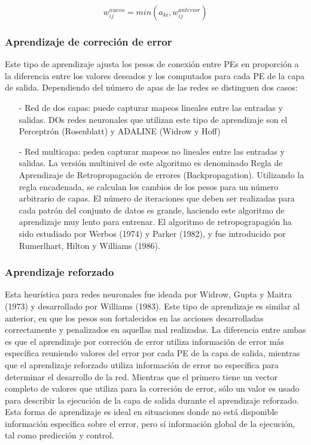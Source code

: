 $$ w_{ij}^{nuevo} = min(a_{ki},w_{ij}^{anterior}) $$

\subsubsection{Aprendizaje de correción de error}

Este tipo de aprendizaje ajusta los pesos de conexión entre PEs en proporción a
la diferencia entre los valores deseados y los computados para cada PE de la
capa de salida. Dependiendo del número de apas de las redes se distinguen dos
casos:
\begin{itemize}
	\item[-] Red de dos capas: puede capturar mapeos lineales entre las entradas 
	y salidas. DOs redes neuronales que utilizan este tipo de aprendizaje son el 
	Perceptrón (Rosenblatt) y ADALINE (Widrow y Hoff)
	\item[-] Red multicapa: peden capturar mapeos no lineales entre las entradas 
	y salidas. La versión multinivel de este algoritmo es denominado Regla de 
	Aprendizaje de Retropropagación de errores (Backpropagation). Utilizando la 
	regla encadenada, se calculan los cambios de los pesos para un número arbitrario 
	de capas. El número de iteraciones que deben ser realizadas para cada patrón 
	del conjunto de datos es grande, haciendo este algoritmo de aprendizaje muy 
	lento para entrenar. El algoritmo de retropograpagión ha sido estudiado por 
	Werbos (1974) y Parker (1982), y fue introducido por Rumerlhart, Hilton y 
	Williams (1986).
\end{itemize}

\subsubsection{Aprendizaje reforzado}

Esta heurística para redes neuronales fue ideada por Widrow, Gupta y Maitra
(1973) y desarrollado por Williams (1983). Este tipo de aprendizaje es similar
al anterior, en que los pesos son fortalecidos en las acciones desarrolladas
correctamente y penalizados en aquellas mal realizadas. La diferencia entre ambas
es que el aprendizaje por correción de error utiliza información de error más
específica reuniendo valores del error por cada PE de la capa de salida,
mientras que el aprendizaje reforzado utiliza información de error no
específica para determinar el desarrollo de la red. Mientras que el primero
tiene un vector completo de valores que utiliza para la correción de error,
sólo un valor es usado para describir la ejecución de la capa de salida durante
el aprendizaje reforzado. Esta forma de aprendizaje es ideal en situaciones
donde no está disponible información específica sobre el error, pero sí
información global de la ejecución, tal como predicción y control.


